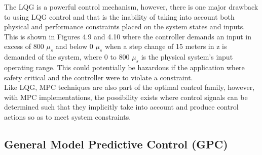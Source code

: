\documentclass[12pt,a4paper,twoside]{report}
\begin{document}
				The LQG is a powerful control mechanism, however, there is one major drawback to using LQG control and that is the inability of taking into account both physical and performance constraints placed on the system states and inputs. This is shown in Figures 4.9 and 4.10 where the controller demands an input in excess of 800 $\mu_s$ and below 0 $\mu_s$ when a  step change of 15 meters in z is demanded of the system, where 0 to 800 $\mu_s$ is the physical system's input operating range. This could potentially be hazardous if the application where safety critical and the controller were to violate a constraint.
				\\
				Like LQG, MPC techniques are also part of the optimal control family, however, with MPC implementations, the possibility exists where control signals can be determined such that they implicitly take into account and produce control actions so as to meet system constraints. 
				
			\subsection{General Model Predictive Control (GPC)}
			
\end{document}
